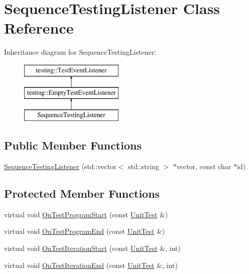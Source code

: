 \hypertarget{class_sequence_testing_listener}{}\section{Sequence\+Testing\+Listener Class Reference}
\label{class_sequence_testing_listener}
Inheritance diagram for Sequence\+Testing\+Listener\+:\begin{figure}[H]
\begin{center}
\leavevmode
\includegraphics[height=3.000000cm]{class_sequence_testing_listener}
\end{center}
\end{figure}
\subsection*{Public Member Functions}
\begin{DoxyCompactItemize}
\item 
\hyperlink{class_sequence_testing_listener_ac0fcb350d20876f8273621ad4c79ba7a}{Sequence\+Testing\+Listener} (std\+::vector$<$ std\+::string $>$ $\ast$vector, const char $\ast$id)
\end{DoxyCompactItemize}
\subsection*{Protected Member Functions}
\begin{DoxyCompactItemize}
\item 
virtual void \hyperlink{class_sequence_testing_listener_a25b96acdbaa6f582e583e6b56bd39b42}{On\+Test\+Program\+Start} (const \hyperlink{classtesting_1_1_unit_test}{Unit\+Test} \&)
\item 
virtual void \hyperlink{class_sequence_testing_listener_aacac5e15bac089460841ff63a5c31f57}{On\+Test\+Program\+End} (const \hyperlink{classtesting_1_1_unit_test}{Unit\+Test} \&)
\item 
virtual void \hyperlink{class_sequence_testing_listener_a345641262fa10cc4b251ac54116db74b}{On\+Test\+Iteration\+Start} (const \hyperlink{classtesting_1_1_unit_test}{Unit\+Test} \&, int)
\item 
virtual void \hyperlink{class_sequence_testing_listener_a783bc01e2a95f5bf73bbde4d96832e0f}{On\+Test\+Iteration\+End} (const \hyperlink{classtesting_1_1_unit_test}{Unit\+Test} \&, int)
\end{DoxyCompactItemize}


